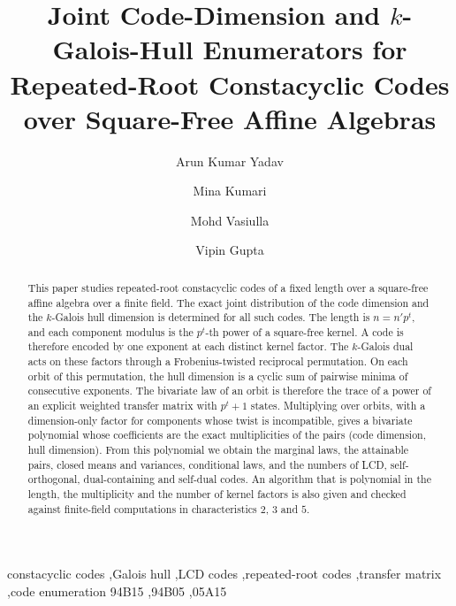 \documentclass[preprint,12pt,a4paper]{elsarticle}
\theoremstyle{definition}
\theoremstyle{remark}
\begin{document}
\begin{frontmatter}

\title{Joint Code-Dimension and $k$-Galois-Hull Enumerators for
Repeated-Root Constacyclic Codes over Square-Free Affine Algebras}

\author[krmu]{Arun Kumar Yadav}

\author[krmu]{Mina Kumari}

\author[sru]{Mohd Vasiulla}

\author[gu]{Vipin Gupta}

\address[krmu]{School of Basic and Applied Sciences, K.R. Mangalam University,
Sohna Road, Gurugram 122103, Haryana, India}
\address[sru]{Department of Mathematics, School of Computer Science \&
Artificial Intelligence, SR University, Warangal 506371, Telangana, India}
\address[gu]{Department of Mathematics, Gurugram University, Gurugram 122505,
Haryana, India}

\begin{abstract}
This paper studies repeated-root constacyclic codes of a fixed length over a
square-free affine algebra over a finite field. The exact joint distribution of
the code dimension and the $k$-Galois hull dimension is determined for all such
codes. The length is $n=n'p^{t}$, and each component modulus is the $p^{t}$-th
power of a square-free kernel. A code is therefore encoded by one exponent at
each distinct kernel factor. The $k$-Galois dual acts on these factors through
a Frobenius-twisted reciprocal permutation. On each orbit of this permutation,
the hull dimension is a cyclic sum of pairwise minima of consecutive exponents.
The bivariate law of an orbit is therefore the trace of a power of an explicit
weighted transfer matrix with $p^{t}+1$ states. Multiplying over orbits, with a
dimension-only factor for components whose twist is incompatible, gives a
bivariate polynomial whose coefficients are the exact multiplicities of the
pairs (code dimension, hull dimension). From this polynomial we obtain the
marginal laws, the attainable pairs, closed means and variances, conditional
laws, and the numbers of LCD, self-orthogonal, dual-containing and self-dual
codes. An algorithm that is polynomial in the length, the multiplicity and the
number of kernel factors is also given and checked against finite-field
computations in characteristics $2$, $3$ and $5$.
\end{abstract}

\begin{keyword}
constacyclic codes \sep Galois hull \sep LCD codes \sep repeated-root codes
\sep transfer matrix \sep code enumeration
\MSC[2020] 94B15 \sep 94B05 \sep 05A15
\end{keyword}

\end{frontmatter}
\end{document}
